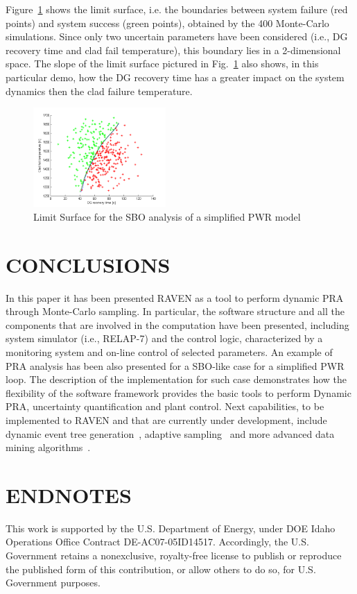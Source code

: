 \documentclass{anstrans}
\begin{document}
Figure~\ref{fig:limit_surface_rng_temp_and_dg} shows the limit surface, i.e. the boundaries between system failure (red points) and system success (green points), obtained by the 400 Monte-Carlo simulations. Since only two uncertain parameters have been considered (i.e., DG recovery time and clad fail temperature), this boundary lies in a 2-dimensional space.
The slope of the limit surface pictured in Fig.~\ref{fig:limit_surface_rng_temp_and_dg} also shows, in this particular demo, how the DG recovery time has a greater impact on the system dynamics then the clad failure temperature.
\begin{figure}
   \centering
    \includegraphics[width=0.45\textwidth]{figures/PRA_limitSurface.png}
    \caption{Limit Surface for the SBO analysis of a simplified PWR model}
    \label{fig:limit_surface_rng_temp_and_dg}
\end{figure}
\section{CONCLUSIONS}
In this paper it has been presented RAVEN as a tool to perform dynamic PRA through Monte-Carlo sampling. In particular, the software structure and all the components that are involved in the computation have been presented, including system simulator (i.e., RELAP-7) and the control logic, characterized by a monitoring system and on-line control of selected parameters.
An example of PRA analysis has been also presented for a SBO-like case for a simplified PWR loop.
The description of the implementation for such case demonstrates how the flexibility of the software framework provides the basic tools to perform Dynamic PRA, uncertainty quantification and plant control.
Next capabilities, to be implemented to RAVEN and that are currently under development, include dynamic event tree generation~\cite{ADAPTHakobyan}, adaptive sampling~\cite{mandelliSVMANS} and more advanced data mining algorithms~\cite{mandelliEsrel2011}.
\section{ENDNOTES}
This work is supported by the U.S. Department of Energy, under DOE Idaho Operations Office Contract DE-AC07-05ID14517. Accordingly, the U.S. Government retains a nonexclusive, royalty-free license to publish or reproduce the published form of this contribution, or allow others to do so, for U.S. Government purposes.



\end{document}
